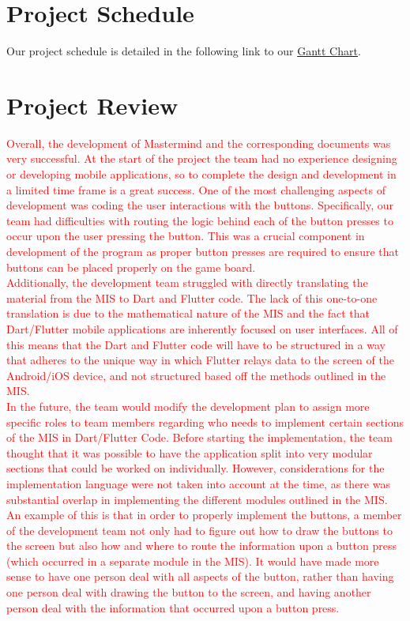 \documentclass{article}
\begin{document}
\section{Project Schedule}
Our project schedule is detailed in the following link to our
\href{https://gitlab.cas.mcmaster.ca/rosnej1/open-mastermind/blob/master/ProjectSchedule/open-mastermind-gantt.pdf}{Gantt Chart}. 

\section{Project Review}
\textcolor{red}{Overall, the development of Mastermind and the corresponding documents was very successful. At the start of the project the team had no experience designing or developing mobile applications, so to complete the design and development in a limited time frame is a great success. One of the most challenging aspects of development was coding the user interactions with the buttons. Specifically, our team had difficulties with routing the logic behind each of the button presses to occur upon the user pressing the button. This was a crucial component in development of the program as proper button presses are required to ensure that buttons can be placed properly on the game board.}\\

\textcolor{red}{Additionally, the development team struggled with directly translating the material from the MIS to Dart and Flutter code. The lack of this one-to-one translation is due to the mathematical nature of the MIS and the fact that Dart/Flutter mobile applications are inherently focused on user interfaces. All of this means that the Dart and Flutter code will have to be structured in a way that adheres to the unique way in which Flutter relays data to the screen of the Android/iOS device, and not structured based off the methods outlined in the MIS.}\\

\textcolor{red}{In the future, the team would modify the development plan to assign more specific roles to team members regarding who needs to implement certain sections of the MIS in Dart/Flutter Code. Before starting the implementation, the team thought that it was possible to have the application split into very modular sections that could be worked on individually. However, considerations for the implementation language were not taken into account at the time, as there was substantial overlap in implementing the different modules outlined in the MIS. An example of this is that in order to properly implement the buttons, a member of the development team not only had to figure out how to draw the buttons to the screen but also how and where to route the information upon a button press (which occurred in a separate module in the MIS). It would have made more sense to have one person deal with all aspects of the button, rather than having one person deal with drawing the button to the screen, and having another person deal with the information that occurred upon a button press.}\\
\end{document}
